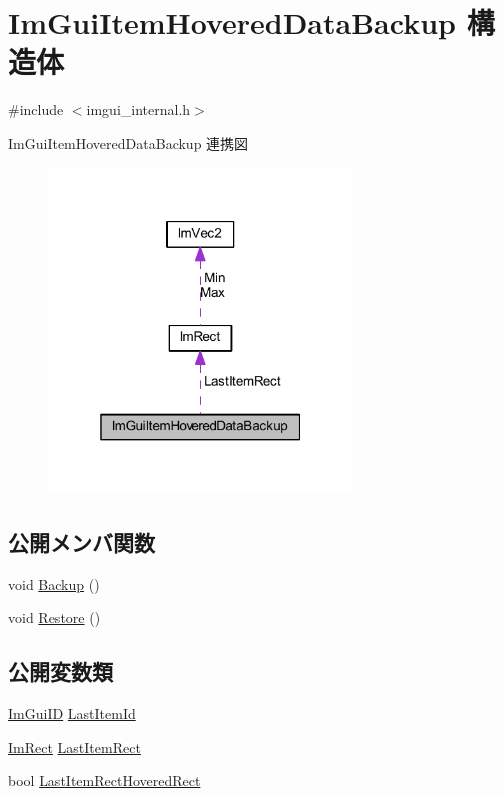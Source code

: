 \hypertarget{struct_im_gui_item_hovered_data_backup}{}\section{Im\+Gui\+Item\+Hovered\+Data\+Backup 構造体}
\label{struct_im_gui_item_hovered_data_backup}


{\ttfamily \#include $<$imgui\+\_\+internal.\+h$>$}



Im\+Gui\+Item\+Hovered\+Data\+Backup 連携図\nopagebreak
\begin{figure}[H]
\begin{center}
\leavevmode
\includegraphics[width=229pt]{struct_im_gui_item_hovered_data_backup__coll__graph}
\end{center}
\end{figure}
\subsection*{公開メンバ関数}
\begin{DoxyCompactItemize}
\item 
void \mbox{\hyperlink{struct_im_gui_item_hovered_data_backup_a2084500d9cbc9455e52fbe87c95f2315}{Backup}} ()
\item 
void \mbox{\hyperlink{struct_im_gui_item_hovered_data_backup_a4d807799df14f74bde55482134b076cc}{Restore}} ()
\end{DoxyCompactItemize}
\subsection*{公開変数類}
\begin{DoxyCompactItemize}
\item 
\mbox{\hyperlink{imgui_8h_a1785c9b6f4e16406764a85f32582236f}{Im\+Gui\+ID}} \mbox{\hyperlink{struct_im_gui_item_hovered_data_backup_a5e0b18013d983269deba7976666fc501}{Last\+Item\+Id}}
\item 
\mbox{\hyperlink{struct_im_rect}{Im\+Rect}} \mbox{\hyperlink{struct_im_gui_item_hovered_data_backup_ae489c222bed561950104a46ddf1387f3}{Last\+Item\+Rect}}
\item 
bool \mbox{\hyperlink{struct_im_gui_item_hovered_data_backup_a48dd47c573d5299de25be908d77f23f0}{Last\+Item\+Rect\+Hovered\+Rect}}
\end{DoxyCompactItemize}


